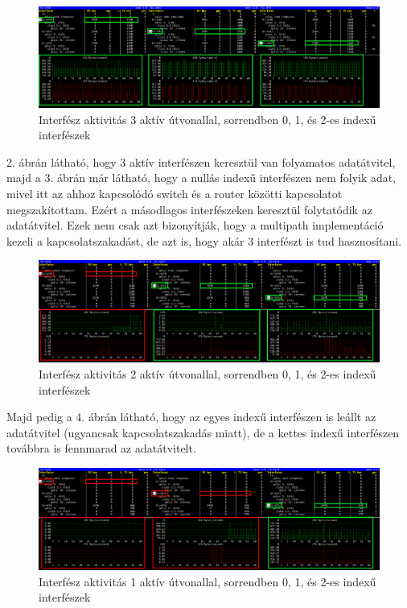 \documentclass[a4paper,oneside]{article}
\begin{document}
\begin{figure}[h]
  \centering
    \hspace*{-1.5cm}%
    \includegraphics[width=18cm]{bmon11}
\caption{Interfész aktivitás 3 aktív útvonallal, sorrendben 0, 1, és 2-es indexű interfészek}
\end{figure}

2. ábrán látható, hogy 3 aktív interfészen keresztül van folyamatos adatátvitel, majd a 3. ábrán 
már látható, hogy a nullás indexű interfészen nem folyik adat, mivel itt az ahhoz kapcsolódó switch és a router közötti kapcsolatot megszakítottam.
Ezért a másodlagos interfészeken keresztül folytatódik az adatátvitel. Ezek nem csak azt bizonyítják, hogy a multipath 
implementáció kezeli a kapcsolatszakadást, de azt is, hogy akár 3 interfészt is tud hasznosítani.


\begin{figure}[h]
  \centering
    \hspace*{-1.5cm}%
    \includegraphics[width=18cm]{bmon22}
\caption{Interfész aktivitás 2 aktív útvonallal, sorrendben 0, 1, és 2-es indexű interfészek}
\end{figure}

Majd pedig a 4. ábrán látható, hogy az egyes indexű interfészen is leállt az adatátvitel (ugyancsak 
kapcsolatszakadás miatt), de a kettes indexű interfészen továbbra is fennmarad az adatátvitelt.

\begin{figure}[h]
  \centering
    \hspace*{-1.5cm}%
    \includegraphics[width=18cm]{bmon33}
\caption{Interfész aktivitás 1 aktív útvonallal, sorrendben 0, 1, és 2-es indexű interfészek}
\end{figure}
\end{document}
